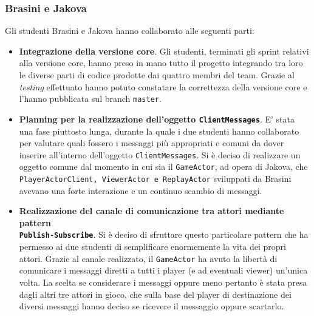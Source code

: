         
        \subsubsection{Brasini e Jakova}\label{subsub:cooperation:brasinijakova}
        Gli studenti Brasini e Jakova hanno collaborato alle seguenti parti:
        
        \begin {itemize}
        \item \textbf{Integrazione della versione core}. Gli studenti, terminati gli sprint relativi alla versione core, hanno preso in mano tutto il progetto integrando tra loro le diverse parti di codice prodotte dai quattro membri del team. Grazie al \textit{testing} effettuato hanno potuto constatare la correttezza della versione core e l'hanno pubblicata sul branch \texttt{master}.
        \item \textbf{Planning per la realizzazione dell'oggetto \texttt{ClientMessages}}. E' stata una fase piuttosto lunga, durante la quale i due studenti hanno collaborato per valutare quali fossero i messaggi più appropriati e comuni da dover inserire all'interno dell'oggetto \texttt{ClientMessages}. Si è deciso di realizzare un oggetto comune dal momento in cui sia il \texttt{GameActor}, ad opera di Jakova, che \texttt{PlayerActorClient, ViewerActor e ReplayActor} sviluppati da Brasini avevano una forte interazione e un continuo scambio di messaggi.
        \item \textbf{Realizzazione del canale di comunicazione tra attori mediante pattern \\ \texttt{Publish-Subscribe}}. Si è deciso di sfruttare questo particolare pattern che ha permesso ai due studenti di semplificare enormemente la vita dei propri attori. Grazie al canale realizzato, il \texttt{GameActor} ha avuto la libertà di comunicare i messaggi diretti a tutti i player (e ad eventuali viewer) un'unica volta. La scelta se considerare i messaggi oppure meno pertanto è stata presa dagli altri tre attori in gioco, che sulla base del player di destinazione dei diversi messaggi hanno deciso se ricevere il messaggio oppure scartarlo.

\end{itemize}
